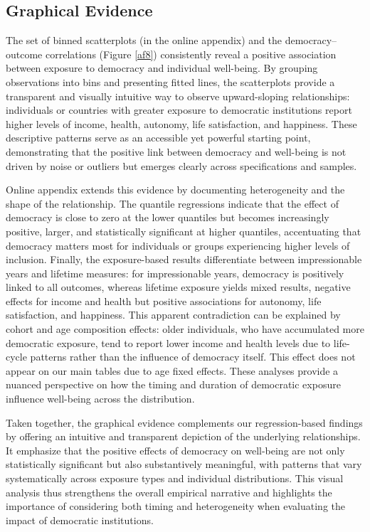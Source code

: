 \documentclass[11pt]{article}
\begin{document}
\vspace*{0.5cm}
\subsection{Graphical Evidence}\label{Main3}

The set of binned scatterplots (in the online appendix) and the democracy–outcome correlations (Figure \ref{af8}) consistently reveal a positive association between exposure to democracy and individual well-being. By grouping observations into bins and presenting fitted lines, the scatterplots provide a transparent and visually intuitive way to observe upward-sloping relationships: individuals or countries with greater exposure to democratic institutions report higher levels of income, health, autonomy, life satisfaction, and happiness. These descriptive patterns serve as an accessible yet powerful starting point, demonstrating that the positive link between democracy and well-being is not driven by noise or outliers but emerges clearly across specifications and samples.

Online appendix extends this evidence by documenting heterogeneity and the shape of the relationship. The quantile regressions indicate that the effect of democracy is close to zero at the lower quantiles but becomes increasingly positive, larger, and statistically significant at higher quantiles, accentuating that democracy matters most for individuals or groups experiencing higher levels of inclusion. Finally, the exposure-based results differentiate between impressionable years and lifetime measures: for impressionable years, democracy is positively linked to all outcomes, whereas lifetime exposure yields mixed results, negative effects for income and health but positive associations for autonomy, life satisfaction, and happiness. This apparent contradiction can be explained by cohort and age composition effects: older individuals, who have accumulated more democratic exposure, tend to report lower income and health levels due to life-cycle patterns rather than the influence of democracy itself. This effect does not appear on our main tables due to age fixed effects. These analyses provide a nuanced perspective on how the timing and duration of democratic exposure influence well-being across the distribution.

Taken together, the graphical evidence complements our regression-based findings by offering an intuitive and transparent depiction of the underlying relationships. It emphasize that the positive effects of democracy on well-being are not only statistically significant but also substantively meaningful, with patterns that vary systematically across exposure types and individual distributions. This visual analysis thus strengthens the overall empirical narrative and highlights the importance of considering both timing and heterogeneity when evaluating the impact of democratic institutions.
\end{document}
